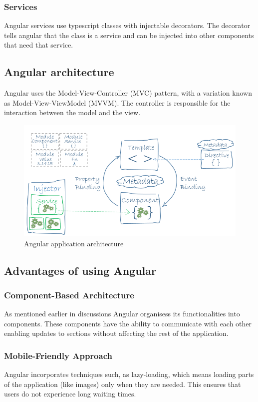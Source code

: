 \subsubsection{Services} Angular services use typescript classes with injectable decorators. The decorator tells angular that the class is a service and can be injected into other components that need that service.\cite{angular-services}


\subsection{Angular architecture}
Angular uses the Model-View-Controller (MVC) pattern, with a variation known as Model-View-ViewModel (MVVM). The controller is responsible for the interaction between the model and the view.

\begin{figure}[ht]
    \centering
    \includegraphics[width=0.85\linewidth]{images/angular-arch.png} 
    \caption{Angular application architecture}
    \label{fig:angular-arch}
\end{figure}

\subsection{Advantages of using Angular}
\subsubsection{Component-Based Architecture} 
 As mentioned earlier in discussions Angular organisess its functionalities into components. These components have the ability to communicate with each other enabling updates to sections without affecting the rest of the application.

\subsubsection{Mobile-Friendly Approach} 
Angular incorporates techniques such, as lazy-loading, which means loading parts of the application (like images) only when they are needed. This ensures that users do not experience long waiting times.

